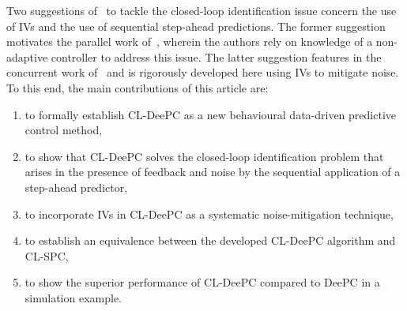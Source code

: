 Two suggestions of~\cite{Dinkla2023} to tackle the closed-loop identification issue concern the use of \ac{IVs} and the use of sequential step-ahead predictions. The former suggestion motivates the parallel work of~\cite{Wang2023}, wherein the authors rely on knowledge of a non-adaptive controller to address this issue. The latter suggestion features in the concurrent work of~\cite{Shi2023} and is rigorously developed here using \ac{IVs} to mitigate noise. %
%
To this end, the main contributions of this article are: 
\begin{enumerate}%
\item to formally establish \acf{CL-DeePC} as a new behavioural data-driven predictive control method, \label{contribution:develop_CL_DeePC}
\item to show that \ac{CL-DeePC} solves the closed-loop identification problem that arises in the presence of feedback and noise by the sequential application of a step-ahead predictor, \label{contribution:solves_CL_issue}
\item to incorporate \ac{IVs} in \ac{CL-DeePC} as a systematic noise-mitigation technique,
\item to establish an equivalence between the developed \ac{CL-DeePC} algorithm and \ac{CL-SPC},
\item to show the superior performance of \ac{CL-DeePC} compared to \ac{DeePC} in a simulation example.
\end{enumerate}

